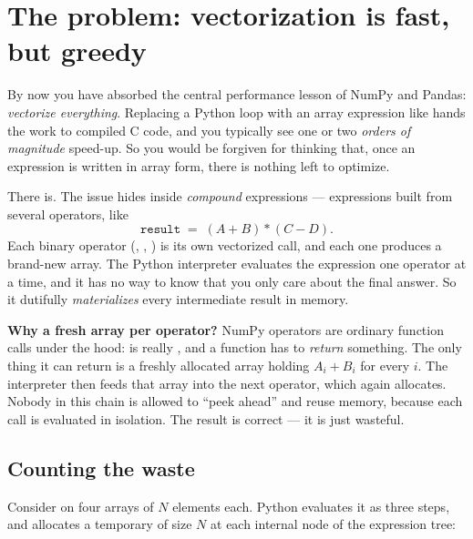 \documentclass[11pt]{article}
\begin{document}

\section{The problem: vectorization is fast, but greedy}

By now you have absorbed the central performance lesson of NumPy and Pandas: \emph{vectorize everything}. Replacing a Python  loop with an array expression like  hands the work to compiled C code, and you typically see one or two \emph{orders of magnitude} speed-up. So you would be forgiven for thinking that, once an expression is written in array form, there is nothing left to optimize.

There is. The issue hides inside \emph{compound} expressions --- expressions built from several operators, like
\[
\texttt{result} \;=\; (A + B) * (C - D).
\]
Each binary operator (\code{+}, \code{-}, \code{*}) is its own vectorized call, and each one produces a brand-new array. The Python interpreter evaluates the expression one operator at a time, and it has no way to know that you only care about the final answer. So it dutifully \emph{materializes} every intermediate result in memory.

\begin{background}
\textbf{Why a fresh array per operator?} NumPy operators are ordinary function calls under the hood:  is really , and a function has to \emph{return} something. The only thing it can return is a freshly allocated array holding $A_i + B_i$ for every $i$. The interpreter then feeds that array into the next operator, which again allocates. Nobody in this chain is allowed to ``peek ahead'' and reuse memory, because each call is evaluated in isolation. The result is correct --- it is just wasteful.
\end{background}

\subsection{Counting the waste}

Consider  on four arrays of $N$ elements each. Python evaluates it as three steps, and allocates a temporary of size $N$ at each internal node of the expression tree:
\end{document}
